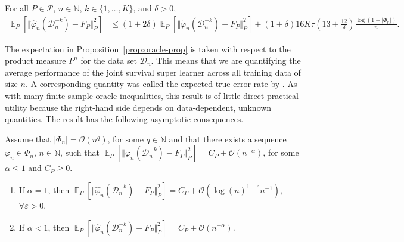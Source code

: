 \documentclass[alpha-refs]{wiley-article}
\DeclareMathOperator{\E}{\mathbb{E}} %
\newcommand{\N}{\mathbb{N}}
\renewcommand{\phi}{\varphi}
\renewcommand{\epsilon}{\varepsilon}
\newcommand\bigO{\ensuremath{\mathcal{O}}}
\newcommand{\1}{\mathbb{1}}
\newcommand{\data}{\ensuremath{\mathcal{D}}}
\begin{document}
\begin{proposition}
  \label{prop:oracle-prop}
  For all \(P\in\mathcal{P}\), \( n \in \N \), \( k \in \{1, \dots, K\} \),
  and $\delta>0$,
  \begin{align*}
    \E_{P}{\left[ \Vert \hat{\phi}_n(\data_n^{-k}) - F_P \Vert_{P}^2 \right]}
    & \leq (1 + 2\delta)
      \E_{P}{\left[ \Vert \tilde{\phi}_n(\data_n^{-k}) - F_P \Vert_{P}^2 \right]}
      + (1+ \delta) 16   K \tau
      \left(
      13 + \frac{12}{\delta}
      \right)
      \frac{\log(1 + |\Phi_n|)}{n}.
  \end{align*}
\end{proposition}

The expectation in Proposition~\ref{prop:oracle-prop} is taken with
respect to the product measure \( P^{n} \) for the data set
\( \data_n \). This means that we are quantifying the average
performance of the joint survival super learner across all training
data of size \(n\). A corresponding quantity was called the expected
true error rate by \cite{efron_and_tibshirani97}. As with many
finite-sample oracle inequalities, this result is of little direct
practical utility because the right-hand side depends on
data-dependent, unknown quantities. The result has the following
asymptotic consequences.

\begin{corollary}
  \label{cor:asymp-cons}
  Assume that \( |\Phi_n| = \bigO(n^q)\), for some
  \( q \in \N \) and that there exists a sequence
  \( \phi_n \in \Phi_n \), \( n \in \N \), such that
  \(  \E_{P}{\left[ \Vert
      \phi_n(\data_n^{-k}) - F_P \Vert_{P}^2 \right]} = C_P +
  \bigO(n^{-\alpha}) \), for some \( \alpha\leq 1 \) and
  \( C_P \geq 0 \).
  \begin{enumerate}[label=(\alph*)]
  \item\label{item:1} If $\alpha=1$, then
    \(
    \E_{P}{\left[ \Vert
        \hat{\phi}_n(\data_n^{-k}) - F_P \Vert_{P}^2 \right]} = C_P +
    \bigO(\log(n)^{1+\epsilon}n^{-1}) \), $\forall\epsilon>0$.
  \item\label{item:2} If $\alpha<1$, then
    \(
    \E_{P}{\left[ \Vert
        \hat{\phi}_n(\data_n^{-k}) - F_P \Vert_{P}^2 \right]} = C_P +
    \bigO(n^{-\alpha}) \).
  \end{enumerate}
\end{corollary}
\end{document}
